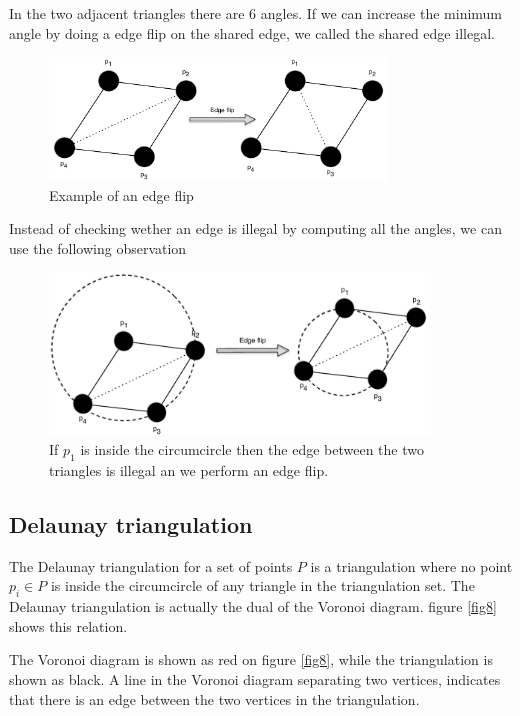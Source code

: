 \documentclass[10pt]{article}
\begin{document}
In the two adjacent triangles there are 6 angles. If we can increase the minimum angle by doing a edge flip on the shared edge, we called the shared edge illegal.

\begin{figure}[ht]
\centering
\includegraphics[width=0.8\textwidth]{figures/fig6.pdf}
\caption{Example of an edge flip}
\label{fig6}
\end{figure}

Instead of checking wether an edge is illegal by computing all the angles, we can use the following observation

\begin{figure}[ht]
\centering
\includegraphics[width=0.9\textwidth]{figures/fig7.pdf}
\caption{If $p_1$ is inside the circumcircle then the edge between the two triangles is illegal an we perform an edge flip.}
\label{fig7}
\end{figure}


\subsection{Delaunay triangulation} %
\label{sub:delaunay_triangulation}
The Delaunay triangulation for a set of points $P$ is a triangulation where no point $p_i \in P$ is inside the circumcircle of any triangle in the triangulation set. The Delaunay triangulation is actually the dual of the Voronoi diagram. figure \ref{fig8} shows this relation. 

The Voronoi diagram is shown as red on figure \ref{fig8}, while the triangulation is shown as black. A line in the Voronoi diagram separating two vertices, indicates that there is an edge between the two vertices in the triangulation.
\end{document}
